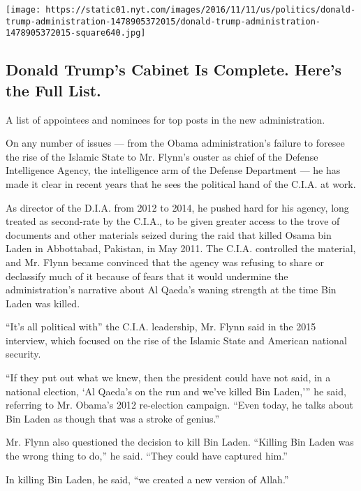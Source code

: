 \href{https://www.nytimes.com/interactive/2016/us/politics/donald-trump-administration.html}{}

\texttt{[image: https://static01.nyt.com/images/2016/11/11/us/politics/donald-trump-administration-1478905372015/donald-trump-administration-1478905372015-square640.jpg]}

\hypertarget{donald-trumps-cabinet-is-complete-heres-the-full-list}{%
\subsection{Donald Trump's Cabinet Is Complete. Here's the Full
List.}\label{donald-trumps-cabinet-is-complete-heres-the-full-list}}

A list of appointees and nominees for top posts in the new
administration.

On any number of issues --- from the Obama administration's failure to
foresee the rise of the Islamic State to Mr. Flynn's ouster as chief of
the Defense Intelligence Agency, the intelligence arm of the Defense
Department --- he has made it clear in recent years that he sees the
political hand of the C.I.A. at work.

As director of the D.I.A. from 2012 to 2014, he pushed hard for his
agency, long treated as second-rate by the C.I.A., to be given greater
access to the trove of documents and other materials seized during the
raid that killed Osama bin Laden in Abbottabad, Pakistan, in May 2011.
The C.I.A. controlled the material, and Mr. Flynn became convinced that
the agency was refusing to share or declassify much of it because of
fears that it would undermine the administration's narrative about Al
Qaeda's waning strength at the time Bin Laden was killed.

``It's all political with'' the C.I.A. leadership, Mr. Flynn said in the
2015 interview, which focused on the rise of the Islamic State and
American national security.

``If they put out what we knew, then the president could have not said,
in a national election, `Al Qaeda's on the run and we've killed Bin
Laden,''' he said, referring to Mr. Obama's 2012 re-election campaign.
``Even today, he talks about Bin Laden as though that was a stroke of
genius.''

Mr. Flynn also questioned the decision to kill Bin Laden. ``Killing Bin
Laden was the wrong thing to do,'' he said. ``They could have captured
him.''

In killing Bin Laden, he said, ``we created a new version of Allah.''

